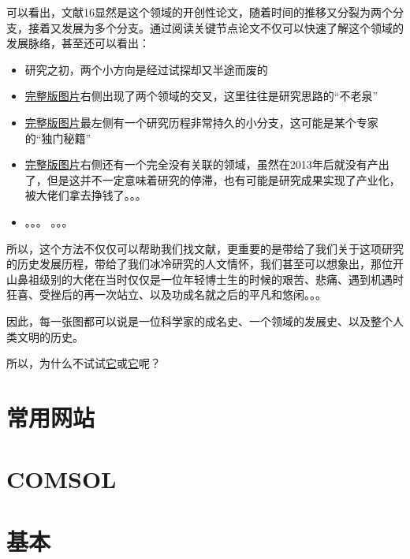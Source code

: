 \documentclass[UTF8]{ctexbook}
\begin{document}
可以看出，文献16显然是这个领域的开创性论文，随着时间的推移又分裂为两个分支，接着又发展为多个分支。通过阅读关键节点论文不仅可以快速了解这个领域的发展脉络，甚至还可以看出：

\begin{itemize}
	\item 研究之初，两个小方向是经过试探却又半途而废的
	\item \href{https://raw.githubusercontent.com/lonelybag/Latex_lonelybag/V1.0/Script/002_NOTE_of_MASTER/Figure/typical_trace_full.jpg}{完整版图片}右侧出现了两个领域的交叉，这里往往是研究思路的“不老泉”
	\item \href{https://raw.githubusercontent.com/lonelybag/Latex_lonelybag/V1.0/Script/002_NOTE_of_MASTER/Figure/typical_trace_full.jpg}{完整版图片}最左侧有一个研究历程非常持久的小分支，这可能是某个专家的“独门秘籍”
	\item \href{https://raw.githubusercontent.com/lonelybag/Latex_lonelybag/V1.0/Script/002_NOTE_of_MASTER/Figure/typical_trace_full.jpg}{完整版图片}右侧还有一个完全没有关联的领域，虽然在2013年后就没有产出了，但是这并不一定意味着研究的停滞，也有可能是研究成果实现了产业化，被大佬们拿去挣钱了。。。
	\item 。。。 。。。
\end{itemize}

所以，这个方法不仅仅可以帮助我们找文献，更重要的是带给了我们关于这项研究的历史发展历程，带给了我们冰冷研究的人文情怀，我们甚至可以想象出，那位开山鼻祖级别的大佬在当时仅仅是一位年轻博士生的时候的艰苦、悲痛、遇到机遇时狂喜、受挫后的再一次站立、以及功成名就之后的平凡和悠闲。。。

因此，每一张图都可以说是一位科学家的成名史、一个领域的发展史、以及整个人类文明的历史。

所以，为什么不试试\href{https://zhuanlan.zhihu.com/p/20902898}{它}或\href{https://zhuanlan.zhihu.com/p/30970993}{它}呢？

\section{常用网站}


\section{COMSOL}

\section{基本}
\end{document}
